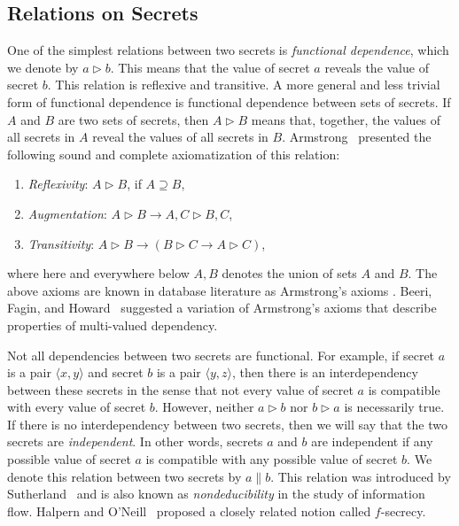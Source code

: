 \documentclass{llncs}
\begin{document}
\subsection{Relations on Secrets}
One of the simplest relations between two secrets is {\em functional dependence}, which we denote by $a\rhd b$. This means that the value of secret $a$ reveals the value of secret $b$. This relation is reflexive and transitive. 
A more general and less trivial form of functional dependence is functional dependence between sets of secrets. If $A$ and $B$ are two sets of secrets, then $A\rhd B$ means that, together, the values of all secrets in $A$ reveal the values of all secrets in $B$. Armstrong~\cite{a74} presented the following sound and complete axiomatization of this relation:
\begin{enumerate}
\item {\em Reflexivity}: $A\rhd B$, if $A\supseteq B$,
\item {\em Augmentation}: $A\rhd B \rightarrow A,C\rhd B,C$,
\item {\em Transitivity}: $A\rhd B \rightarrow (B\rhd C \rightarrow A\rhd C)$,
\end{enumerate}
where here and everywhere below $A,B$ denotes the union of sets $A$ and $B$. The above axioms are known in database literature as Armstrong's axioms \cite[p.~81]{guw09}. Beeri, Fagin, and Howard~\cite{bfh77} suggested a variation of Armstrong's axioms that describe properties of multi-valued dependency.

Not all dependencies between two secrets are functional. For example, if secret $a$ is a pair $\langle x, y\rangle$ and 
secret $b$ is a pair $\langle y, z\rangle$, then there is an interdependency between these secrets in the sense that not every value of secret $a$ is compatible with every value of secret $b$. However, neither $a\rhd b$ nor $b\rhd a$ is necessarily true. If there is no interdependency between two secrets, then we will say that the two secrets are {\em independent}. In other words, secrets $a$ and $b$ are independent if any possible value of secret $a$ is compatible with any possible value of secret $b$. We denote this relation between two secrets by $a\parallel b$. This relation was introduced by Sutherland~\cite{s86} and is also known as {\em nondeducibility} in the study of information flow. Halpern and O'Neill~\cite{ho08} proposed a closely related notion called $f$-secrecy. 
\end{document}
